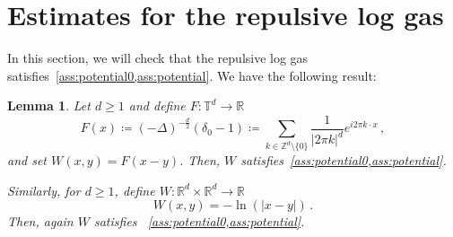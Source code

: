 \documentclass[a4paper,10pt,twoside]{amsart}
\newtheorem{lemma}[theorem]{Lemma}
\theoremstyle{remark}
\theoremstyle{definition}
\numberwithin{equation}{section}
\newcommand{\T}{\mathbb{T}}
\newcommand{\R}{\mathbb{R}}
\newcommand{\Z}{\mathbb{Z}}
\newcommand{\0}{{\bf 0}}
\newcommand{\+}{\hspace{-.5ex}+\hspace{-.5ex}}
\begin{document}
\section{Estimates for the repulsive log gas} %
\label{sec:estimates_for_the_repulsive_log_gas}
In this section, we will check that the repulsive log gas satisfies~\cref{ass:potential0,ass:potential}. We have the following result:
\begin{lemma}
  Let $d\geq 1$ and define $F:\T^d \to \R$
  \begin{equation}
    F(x)\coloneqq(-\Delta)^{-\frac d2} (\delta_0 -1) \coloneqq \sum_{k \in \Z^d\setminus \{0\}}\frac{1}{|2 \pi k|^d}e^{i 2 \pi k\cdot x} \, , 
  \end{equation}
  and set $W(x,y)=F(x-y)$. Then, $W$ satisfies~\cref{ass:potential0,ass:potential}. 

  Similarly, for  $d\geq 1$, define $W:\R^d \times \R^d \to \R$
  \begin{equation}
    W(x,y)=-\ln (|x-y|) \, .
  \end{equation}
  Then, again $W$ satisfies ~\cref{ass:potential0,ass:potential}.
\end{lemma}
\end{document}
